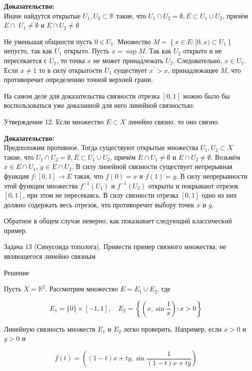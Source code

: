 \documentclass[a4paper,12pt]{article} %
\begin{document}
	\textbf{Доказательство:\\}
	Иначе найдутся открытые $U_{1}, U_{2} \subset \mathbb{R}$ такие, что $U_{1} \cap U_{2}=\emptyset, E \subset U_{1} \cup U_{2}$, причём $E \cap$ $U_{1} \neq \emptyset$ и $E \cap U_{2} \neq \emptyset$
	
	Не уменьшая общности пусть $0 \in U_{1}$. Множество $M=\left\{x \in E:[0, x) \subset U_{1}\right\}$ непусто, так как $U_{1}$ открыто. Пусть $x=\sup M$. Так как $U_{2}$ открыто и не пересекается с $U_{1}$, то точка $x$ не может принадлежать $U_{2}$. Следовательно, $x \in U_{1}$. Если $x \neq 1$ то в силу открытости $U_{1}$ существует $x^{\prime}>x$, принадлежащее $M$, что противоречит определению точной верхней грани.
	
	На самом деле для доказательства связности отрезка $[0,1]$ можно было бы воспользоваться уже доказанной для него линейной связностью:
	
	Утверждение 12. Если множество $E \subset X$ линейно связно, то оно связно.
	
	\textbf{Доказательство:\\}
	Предположим противное. Тогда существуют открытые множества $U_{1}, U_{2} \subset X$ такие, что $U_{1} \cap U_{2}=\emptyset, E \subset U_{1} \cup U_{2}$, причём $E \cap U_{1} \neq \emptyset$ и $E \cap U_{2} \neq \emptyset$. Возьмём $x \in E \cap U_{1}$, $y \in E \cap U_{2}$. В силу линейной связности существует непрерывная функция $f:[0,1] \rightarrow E$ такая, что $f(0)=x$ и $f(1)=y$. В силу непрерывности этой функции множества $f^{-1}\left(U_{1}\right)$ и $f^{-1}\left(U_{2}\right)$ открыты и покрывают отрезок $[0,1]$, при этом не пересекаясь. В силу связности отрезка $[0,1]$ одно из них должно содержать весь отрезок, что противоречит выбору точек $x$ и $y$.
	
	Обратное в общем случае неверно, как показывает следующий классический пример.
	
	Задача 13 (Синусоида тополога). Привести пример связного множества, не являющегося линейно связным
	
	Решение
	
	Пусть $X=\mathbb{R}^{2}$. Рассмотрим множество $E=E_{1} \cup E_{2}$, где
	
	$$
	E_{1}=\{0\} \times[-1,1], \quad E_{2}=\left\{\left(x, \sin \frac{1}{x}\right): x>0\right\}
	$$
	
	Линейную связность множеств $E_{1}$ и $E_{2}$ легко проверить. Например, если $x>0$ и $y>0$ и
	
	$$
	f(t)=\left((1-t) x+t y, \sin \frac{1}{(1-t) x+t y}\right)
	$$
	
\end{document}
